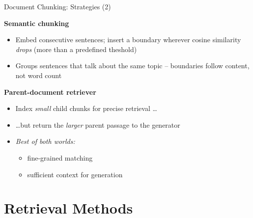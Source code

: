 \documentclass[11pt,compress,t,notes=noshow, xcolor=table]{beamer}
\begin{document}
\begin{frame}{Document Chunking: Strategies (2)}

\vspace{0.5em}

\textbf{Semantic chunking}
\begin{itemize}
    \item Embed consecutive sentences; insert a boundary wherever cosine similarity \textit{drops} (more than a predefined theshold)
    \item Groups sentences that talk about the same topic -- boundaries follow content, not word count
\end{itemize}

\vspace{0.6em}

\textbf{Parent-document retriever} 
\begin{itemize}
    \item Index \textit{small} child chunks for precise retrieval \ldots
    \item \ldots but return the \textit{larger} parent passage to the generator
    \item \textit{Best of both worlds:} 
			\begin{itemize}
				\item fine-grained matching
				\item sufficient context for generation
			\end{itemize}
\end{itemize}

\vfill

\end{frame}


\section{Retrieval Methods}
\end{document}
